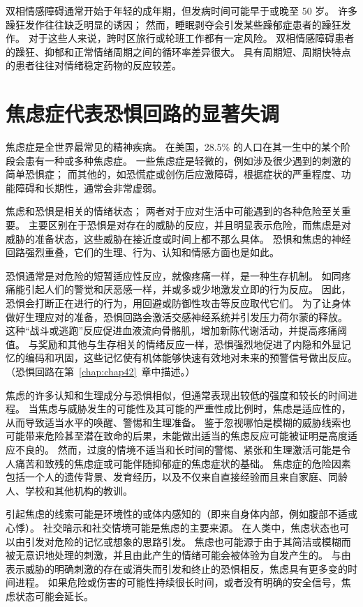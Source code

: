 双相情感障碍通常开始于年轻的成年期，但发病时间可能早于或晚至 50 岁。
许多躁狂发作往往缺乏明显的诱因；
然而，睡眠剥夺会引发某些躁郁症患者的躁狂发作。
对于这些人来说，跨时区旅行或轮班工作都有一定风险。
双相情感障碍患者的躁狂、抑郁和正常情绪周期之间的循环率差异很大。
具有周期短、周期快特点的患者往往对情绪稳定药物的反应较差。



\section{焦虑症代表恐惧回路的显著失调}

焦虑症是全世界最常见的精神疾病。
在美国，28.5\% 的人口在其一生中的某个阶段会患有一种或多种焦虑症。
一些焦虑症是轻微的，例如涉及很少遇到的刺激的简单恐惧症；
而其他的，如恐慌症或创伤后应激障碍，根据症状的严重程度、功能障碍和长期性，通常会非常虚弱。


焦虑和恐惧是相关的情绪状态；
两者对于应对生活中可能遇到的各种危险至关重要。
主要区别在于恐惧是对存在的威胁的反应，并且明显表示危险，而焦虑是对威胁的准备状态，这些威胁在接近度或时间上都不那么具体。
恐惧和焦虑的神经回路强烈重叠，它们的生理、行为、认知和情感方面也是如此。


恐惧通常是对危险的短暂适应性反应，就像疼痛一样，是一种生存机制。
如同疼痛能引起人们的警觉和厌恶感一样，并或多或少地激发立即的行为反应。
因此，恐惧会打断正在进行的行为，用回避或防御性攻击等反应取代它们。
为了让身体做好生理应对的准备，恐惧回路会激活交感神经系统并引发压力荷尔蒙的释放。
这种“战斗或逃跑”反应促进血液流向骨骼肌，增加新陈代谢活动，并提高疼痛阈值。
与奖励和其他与生存相关的情绪反应一样，恐惧强烈地促进了内隐和外显记忆的编码和巩固，这些记忆使有机体能够快速有效地对未来的预警信号做出反应。 
（恐惧回路在第~\ref{chap:chap42}~章中描述。）


焦虑的许多认知和生理成分与恐惧相似，但通常表现出较低的强度和较长的时间进程。
当焦虑与威胁发生的可能性及其可能的严重性成比例时，焦虑是适应性的，从而导致适当水平的唤醒、警惕和生理准备。
鉴于忽视哪怕是模糊的威胁线索也可能带来危险甚至潜在致命的后果，未能做出适当的焦虑反应可能被证明是高度适应不良的。
然而，过度的情境不适当和长时间的警惕、紧张和生理激活可能是令人痛苦和致残的焦虑症或可能伴随抑郁症的焦虑症状的基础。
焦虑症的危险因素包括一个人的遗传背景、发育经历，以及不仅来自直接经验而且来自家庭、同龄人、学校和其他机构的教训。


引起焦虑的线索可能是环境性的或体内感知的（即来自身体内部，例如腹部不适或心悸）。
社交暗示和社交情境可能是焦虑的主要来源。
在人类中，焦虑状态也可以由引发对危险的记忆或想象的思路引发。
焦虑也可能源于由于其简洁或模糊而被无意识地处理的刺激，并且由此产生的情绪可能会被体验为自发产生的。
与由表示威胁的明确刺激的存在或消失而引发和终止的恐惧相反，焦虑具有更多变的时间进程。
如果危险或伤害的可能性持续很长时间，或者没有明确的安全信号，焦虑状态可能会延长。


